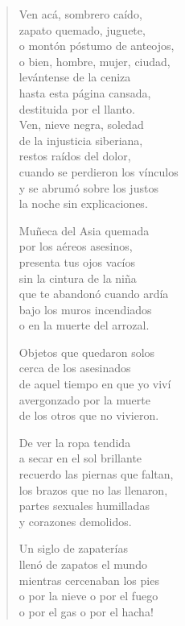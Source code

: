 \documentclass[12pt]{article}
\begin{document}
\clearpage
{}
\begin{verse}

Ven acá, sombrero caído,\\
zapato quemado, juguete,\\
o montón póstumo de anteojos,\\
o bien, hombre, mujer, ciudad,\\
levántense de la ceniza\\
hasta esta página cansada,\\
destituida por el llanto.\\
Ven, nieve negra, soledad\\
de la injusticia siberiana,\\
restos raídos del dolor,\\
cuando se perdieron los vínculos\\
y se abrumó sobre los justos\\
la noche sin explicaciones.  

Muñeca del Asia quemada\\
por los aéreos asesinos,\\
presenta tus ojos vacíos\\
sin la cintura de la niña\\
que te abandonó cuando ardía\\
bajo los muros incendiados\\
o en la muerte del arrozal.  

Objetos que quedaron solos\\
cerca de los asesinados\\
de aquel tiempo en que yo viví\\
avergonzado por la muerte\\
de los otros que no vivieron.  

De ver la ropa tendida\\
a secar en el sol brillante\\
recuerdo las piernas que faltan,\\
los brazos que no las llenaron,\\
partes sexuales humilladas\\
y corazones demolidos.  

Un siglo de zapaterías\\
llenó de zapatos el mundo\\
mientras cercenaban los pies\\
o por la nieve o por el fuego\\
o por el gas o por el hacha!  


\end{verse}
\end{document}
